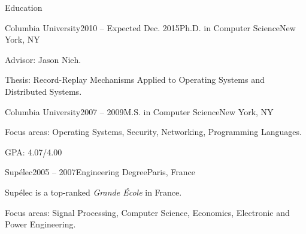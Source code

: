 \documentclass{resume} %
\newcommand{\columbia}{{Columbia University}\xspace}
\newcommand{\supelec}{{Sup\'{e}lec}\xspace}
\newcommand{\eiffel}{{Lyc\'{e}e Gustave Eiffel}\xspace}
\begin{document}
\vspace{-1em}


\begin{rSection}{Education}

\begin{rSubsection}{\columbia}{2010 -- Expected Dec. 2015}{Ph.D. in Computer Science}{New York, NY}
\item Advisor: Jason Nieh.
\item Thesis: Record-Replay Mechanisms Applied to Operating Systems and Distributed Systems.
\end{rSubsection}

\begin{rSubsection}{\columbia}{2007 -- 2009}{M.S. in Computer Science}{New York, NY}
\item Focus areas: Operating Systems, Security, Networking, Programming Languages.
\item GPA: 4.07/4.00
\end{rSubsection}

\begin{rSubsection}{\supelec}{2005 -- 2007}{Engineering Degree}{Paris, France}
\item \supelec is a top-ranked {\em Grande \'{E}cole} in France.
\item Focus areas: Signal Processing, Computer Science, Economics, Electronic and Power Engineering.
\end{rSubsection}


\end{rSection}

\end{document}
